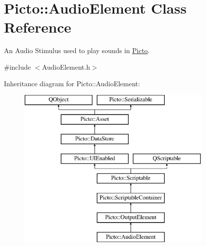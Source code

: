 \hypertarget{class_picto_1_1_audio_element}{\section{Picto\-:\-:Audio\-Element Class Reference}
\label{class_picto_1_1_audio_element}
}


An Audio Stimulus used to play sounds in \hyperlink{namespace_picto}{Picto}.  




{\ttfamily \#include $<$Audio\-Element.\-h$>$}

Inheritance diagram for Picto\-:\-:Audio\-Element\-:\begin{figure}[H]
\begin{center}
\leavevmode
\includegraphics[height=8.000000cm]{class_picto_1_1_audio_element}
\end{center}
\end{figure}
